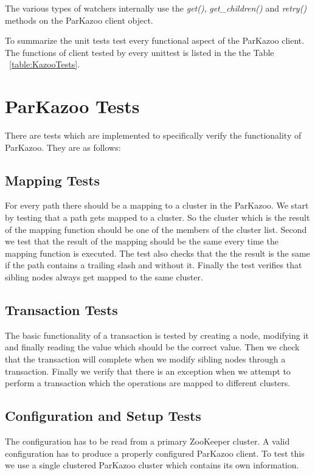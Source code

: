 	The various types of watchers internally use the \textit{get()}, \textit{get\_children()} and \textit{retry()} methods on the ParKazoo client object.

To summarize the unit tests test every functional aspect of the ParKazoo client. The functions of client tested by every unittest is listed in the the Table ~\ref{table:KazooTests}.



\section{ParKazoo Tests}
There are tests which are implemented to specifically verify the functionality of ParKazoo. They are as follows:

\subsection{Mapping Tests}
For every path there should be a mapping to a cluster in the ParKazoo. We start by testing that a path gets mapped to a cluster. So the cluster which is the result of the mapping function should be one of the members of the cluster list. Second we test that the result of the mapping should be the same every time the mapping function is executed. The test also checks that the the result is the same if the path contains a trailing slash and without it. Finally the test verifies that sibling nodes always get mapped to the same cluster.

\subsection{Transaction Tests}
The basic functionality of a transaction is tested by creating a node, modifying it and finally reading the value which should be the correct value. Then we check that the transaction will complete when we modify sibling nodes through a transaction. Finally we verify that there is an exception when we attempt to perform a transaction which the operations are mapped to different clusters.

\subsection{Configuration and Setup Tests}
The configuration has to be read from a primary ZooKeeper cluster. A valid configuration has to produce a properly configured ParKazoo client. To test this we use a single clustered ParKazoo cluster which contains its own information.

